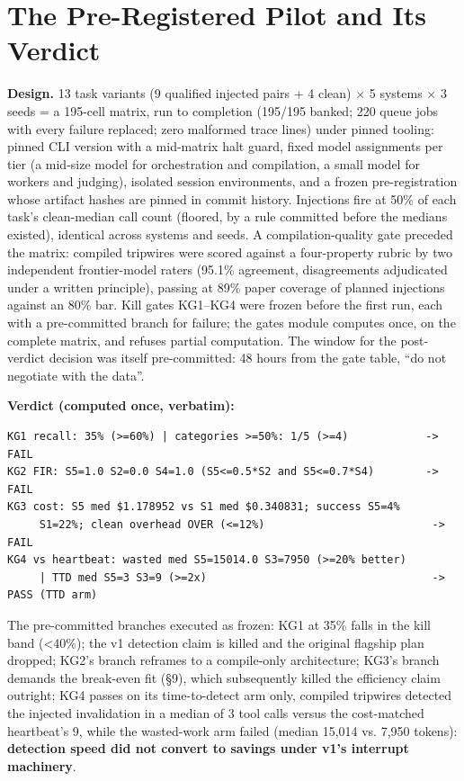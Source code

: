 \documentclass[acmsmall,screen,review,anonymous]{acmart}
\begin{document}
\section{The Pre-Registered Pilot and Its Verdict}
\textbf{Design.} 13 task variants (9 qualified injected pairs + 4 clean) $\times$ 5 systems $\times$ 3 seeds = a 195-cell matrix, run to completion (195/195 banked; 220 queue jobs with every failure replaced; zero malformed trace lines) under pinned tooling: pinned CLI version with a mid-matrix halt guard, fixed model assignments per tier (a mid-size model for orchestration and compilation, a small model for workers and judging), isolated session environments, and a frozen pre-registration whose artifact hashes are pinned in commit history. Injections fire at 50\% of each task's clean-median call count (floored, by a rule committed before the medians existed), identical across systems and seeds. A compilation-quality gate preceded the matrix: compiled tripwires were scored against a four-property rubric by two independent frontier-model raters (95.1\% agreement, disagreements adjudicated under a written principle), passing at 89\% paper coverage of planned injections against an 80\% bar. Kill gates KG1--KG4 were frozen before the first run, each with a pre-committed branch for failure; the gates module computes once, on the complete matrix, and refuses partial computation. The window for the post-verdict decision was itself pre-committed: 48 hours from the gate table, ``do not negotiate with the data''.

\textbf{Verdict (computed once, verbatim):}

\begin{lstlisting}
KG1 recall: 35% (>=60%) | categories >=50%: 1/5 (>=4)            -> FAIL
KG2 FIR: S5=1.0 S2=0.0 S4=1.0 (S5<=0.5*S2 and S5<=0.7*S4)        -> FAIL
KG3 cost: S5 med $1.178952 vs S1 med $0.340831; success S5=4%
     S1=22%; clean overhead OVER (<=12%)                          -> FAIL
KG4 vs heartbeat: wasted med S5=15014.0 S3=7950 (>=20% better)
     | TTD med S5=3 S3=9 (>=2x)                                   -> PASS (TTD arm)
\end{lstlisting}
The pre-committed branches executed as frozen: KG1 at 35\% falls in the kill band (<40\%); the v1 detection claim is killed and the original flagship plan dropped; KG2's branch reframes to a compile-only architecture; KG3's branch demands the break-even fit (\S9), which subsequently killed the efficiency claim outright; KG4 passes on its time-to-detect arm only, compiled tripwires detected the injected invalidation in a median of 3 tool calls versus the cost-matched heartbeat's 9, while the wasted-work arm failed (median 15,014 vs. 7,950 tokens): \textbf{detection speed did not convert to savings under v1's interrupt machinery}.
\end{document}

